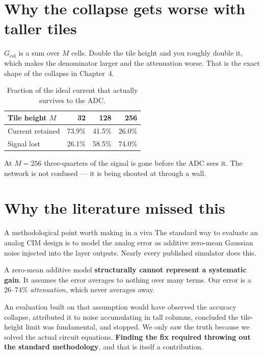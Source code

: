 \documentclass[11pt,a4paper]{report}
\begin{document}
\section{Why the collapse gets worse with taller tiles}

$G_{\mathrm{col}}$ is a sum over $M$ cells. Double the tile height and you
roughly double it, which makes the denominator larger and the attenuation
worse. That is the exact shape of the collapse in Chapter~4.

\begin{table}[h]
\centering
\caption{Fraction of the ideal current that actually survives to the ADC.}
\begin{tabular}{lrrr}
\toprule
Tile height $M$ & 32 & 128 & 256 \\
\midrule
Current retained & 73.9\% & 41.5\% & 26.0\% \\
Signal lost & 26.1\% & 58.5\% & 74.0\% \\
\bottomrule
\end{tabular}
\end{table}

At $M=256$ three-quarters of the signal is gone before the ADC sees it. The
network is not confused --- it is being shouted at through a wall.

\section{Why the literature missed this}

\begin{warnbox}{A methodological point worth making in a viva}
The standard way to evaluate an analog CIM design is to model the analog error
as additive zero-mean Gaussian noise injected into the layer outputs. Nearly
every published simulator does this.

A zero-mean additive model \textbf{structurally cannot represent a systematic
gain}. It assumes the error averages to nothing over many terms. Our error is
a 26--74\% \emph{attenuation}, which never averages away.

An evaluation built on that assumption would have observed the accuracy
collapse, attributed it to noise accumulating in tall columns, concluded the
tile-height limit was fundamental, and stopped. We only saw the truth because
we solved the actual circuit equations. \textbf{Finding the fix required
throwing out the standard methodology}, and that is itself a contribution.
\end{warnbox}
\end{document}
